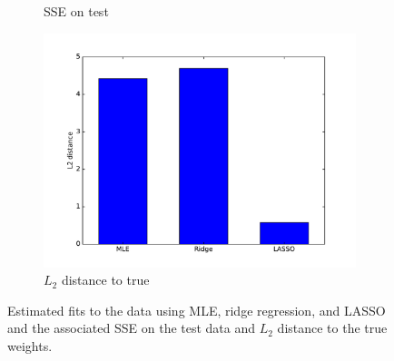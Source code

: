 \documentclass[10pt,psamsfonts]{amsart}
\theoremstyle{definition}
\theoremstyle{remark}
\numberwithin{equation}{section}
\begin{document}
\begin{figure}
\begin{subfigure}[b]{0.25\textwidth}
		\caption{SSE on test}
	\end{subfigure}
	\begin{subfigure}[b]{0.25\textwidth}
		\includegraphics[width=\textwidth]{hw1_4-1_3.pdf}
		\caption{$L_2$ distance to true}
	\end{subfigure}
	\caption{Estimated fits to the data using MLE, ridge regression, and LASSO and the associated SSE on the test data and $L_2$ distance to the true weights.}
\end{figure}
\end{document}
